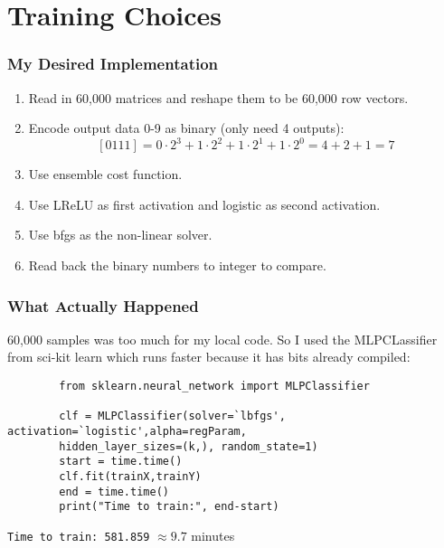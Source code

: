 \documentclass{beamer}
\begin{document}
\section{Training Choices}
	\begin{frame}
		\frametitle{My Desired Implementation}
		\begin{enumerate}
			\pause
			\item Read in 60,000 matrices and reshape them to be 60,000 row vectors.
			\pause
			\item Encode output data 0-9 as binary (only need 4 outputs):
			$$[0 1 1 1] = 0\cdot2^3 + 1\cdot2^2 +1\cdot2^1 +1\cdot 2^0 = 4+2+1 =7$$
			\pause
			\item Use ensemble cost function.
			\pause
			\item Use LReLU as first activation and logistic as second activation.
			\pause
			\item Use bfgs as the non-linear solver.
			\pause
			\item Read back the binary numbers to integer to compare.
		\end{enumerate}
	\end{frame}
	\begin{frame}[fragile]
		\frametitle{What Actually Happened}
		60,000 samples was too much for my local code. So I used the MLPCLassifier from sci-kit learn which runs faster because it has bits already compiled:
		\begin{lstlisting}
		from sklearn.neural_network import MLPClassifier
		
		clf = MLPClassifier(solver=`lbfgs', activation=`logistic',alpha=regParam,
		hidden_layer_sizes=(k,), random_state=1)
		start = time.time()
		clf.fit(trainX,trainY)
		end = time.time()
		print("Time to train:", end-start)
		\end{lstlisting}
		\texttt{Time to train: 581.859} $\approx 9.7$ minutes
	\end{frame}
\end{document}

